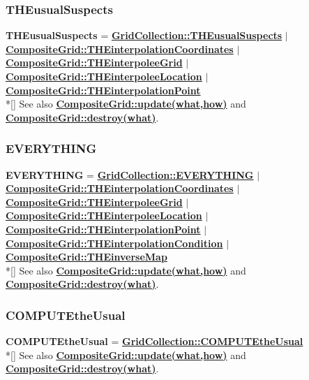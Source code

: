 \documentclass{article}
\begin{document}
  \subsubsection{THEusualSuspects}
  \label{CompositeGrid::THEusualSuspects}
    \textbf{THEusualSuspects}
    =      {\bf{}\hyperref{GridCollection::THEusualSuspects}{GridCollection::THEusualSuspects \rm(\S}{)}{GridCollection::THEusualSuspects}}
    $\mid$ {\bf{}\hyperref{THEinterpolationCoordinates}{THEinterpolationCoordinates \rm(\S}{)}{CompositeGrid::THEinterpolationCoordinates}}
    $\mid$ {\bf{}\hyperref{THEinterpoleeGrid}{THEinterpoleeGrid \rm(\S}{)}{CompositeGrid::THEinterpoleeGrid}}
    $\mid$ {\bf{}\hyperref{THEinterpoleeLocation}{THEinterpoleeLocation \rm(\S}{)}{CompositeGrid::THEinterpoleeLocation}}
    $\mid$ {\bf{}\hyperref{THEinterpolationPoint}{THEinterpolationPoint \rm(\S}{)}{CompositeGrid::THEinterpolationPoint}} \\*[\parskip]
    See also {\bf{}\hyperref{update(what,how)}{update(what,how) \rm(\S}{)}{CompositeGrid::update(what,how)}}
    and {\bf{}\hyperref{destroy(what)}{destroy(what) \rm(\S}{)}{CompositeGrid::destroy(what)}}.

  \subsubsection{EVERYTHING}
  \label{CompositeGrid::EVERYTHING}
    \textbf{EVERYTHING}
    =      {\bf{}\hyperref{GridCollection::EVERYTHING}{GridCollection::EVERYTHING \rm(\S}{)}{GridCollection::EVERYTHING}}
    $\mid$ {\bf{}\hyperref{THEinterpolationCoordinates}{THEinterpolationCoordinates \rm(\S}{)}{CompositeGrid::THEinterpolationCoordinates}}
    $\mid$ {\bf{}\hyperref{THEinterpoleeGrid}{THEinterpoleeGrid \rm(\S}{)}{CompositeGrid::THEinterpoleeGrid}}
    $\mid$ {\bf{}\hyperref{THEinterpoleeLocation}{THEinterpoleeLocation \rm(\S}{)}{CompositeGrid::THEinterpoleeLocation}}
    $\mid$ {\bf{}\hyperref{THEinterpolationPoint}{THEinterpolationPoint \rm(\S}{)}{CompositeGrid::THEinterpolationPoint}}
    $\mid$ {\bf{}\hyperref{THEinterpolationCondition}{THEinterpolationCondition \rm(\S}{)}{CompositeGrid::THEinterpolationCondition}}
    $\mid$ {\bf{}\hyperref{THEinverseMap}{THEinverseMap \rm(\S}{)}{CompositeGrid::THEinverseMap}} \\*[\parskip]
    See also {\bf{}\hyperref{update(what,how)}{update(what,how) \rm(\S}{)}{CompositeGrid::update(what,how)}}
    and {\bf{}\hyperref{destroy(what)}{destroy(what) \rm(\S}{)}{CompositeGrid::destroy(what)}}.

  \subsubsection{COMPUTEtheUsual}
  \label{CompositeGrid::COMPUTEtheUsual}
    \textbf{COMPUTEtheUsual} =
    {\bf{}\hyperref{GridCollection::COMPUTEtheUsual}{GridCollection::COMPUTEtheUsual \rm(\S}{)}{GridCollection::COMPUTEtheUsual}} \\*[\parskip]
    See also {\bf{}\hyperref{update(what,how)}{update(what,how) \rm(\S}{)}{CompositeGrid::update(what,how)}}
    and {\bf{}\hyperref{destroy(what)}{destroy(what) \rm(\S}{)}{CompositeGrid::destroy(what)}}.
\end{document}
